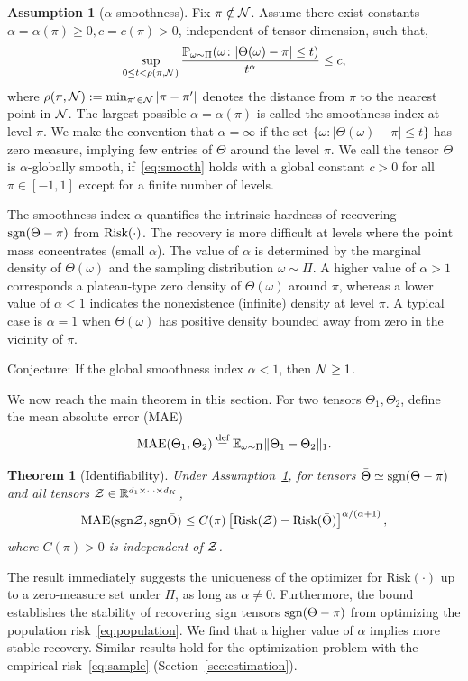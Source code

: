 \documentclass{article}
\theoremstyle{plain}
\newtheorem{thm}{Theorem}[section]
\theoremstyle{definition}
\newtheorem{assumption}{Assumption}
\def\sign{\textup{sgn}}
\def\risk{\textup{Risk}}
\begin{document}

\begin{assumption}[$\alpha$-smoothness]\label{ass:margin} 
Fix $\pi\notin \mathcal{N}$. Assume there exist constants $\alpha=\alpha(\pi)\geq 0, c=c(\pi) >0$, independent of tensor dimension, such that, 
\begin{equation}\label{eq:smooth}
\sup_{0\leq t<\rho(\pi, \mathcal{N})}{\mathbb{P}_{\omega \sim \Pi}(\omega \colon |\Theta (\omega)-\pi|\leq t )\over t^\alpha} \leq c,
\end{equation}
where $\rho(\pi,\mathcal{N}):=\min_{\pi'\in \mathcal{N}}|\pi-\pi'|$ denotes the distance from $\pi$ to the nearest point in $\mathcal{N}$. The largest possible $\alpha=\alpha(\pi)$ is called the smoothness index at level $\pi$. We make the convention that $\alpha= \infty$ if the set $\{\omega\colon |\Theta(\omega)-\pi|\leq t\}$ has zero measure, implying few entries of $\Theta$ around the level $\pi$. We call the tensor $\Theta$ is $\alpha$-globally smooth, if~\eqref{eq:smooth} holds with a global constant $c>0$ for all $\pi\in[-1,1]$ except for a finite number of levels. 
\end{assumption}

The smoothness index $\alpha$ quantifies the intrinsic hardness of recovering $\sign(\Theta-\pi)$ from $\risk(\cdot)$. The recovery is more difficult at levels where the point mass concentrates (small $\alpha$). The value of $\alpha$ is determined by the marginal density of $\Theta(\omega)$ and the sampling distribution $\omega\sim \Pi$. A higher value of $\alpha>1$ corresponds a plateau-type zero density of $\Theta(\omega)$ around $\pi$, whereas a lower value of $\alpha<1$ indicates the nonexistence (infinite) density at level $\pi$. A typical case is $\alpha=1$ when $\Theta(\omega)$ has positive density bounded away from zero in the vicinity of $\pi$. 

{\color{red}Conjecture: If the global smoothness index $\alpha<1$, then $\mathcal{N}\geq 1$. }


We now reach the main theorem in this section. For two tensors $\Theta_1,\Theta_2$, define the mean absolute error (MAE)
\[
\text{MAE}(\Theta_1, \Theta_2)\stackrel{\text{def}}{=}\mathbb{E}_{\omega\sim \Pi}\lVert\Theta_1-\Theta_2\rVert_1.
\]
\begin{thm}[Identifiability] Under Assumption~\ref{ass:margin}, for tensors $\bar \Theta \simeq \sign(\Theta-\pi)$ and all tensors $\mathcal{Z}\in\mathbb{R}^{d_1\times \cdots \times d_K}$,
\[
\textup{MAE}(\sign \tZ, \sign \bar \Theta) \leq C(\pi)\left[\textup{Risk}(\tZ)-\textup{Risk}( \bar \Theta)\right]^{\alpha/(\alpha+1)},
\]
where $C(\pi)>0$ is independent of $\mathcal{Z}$. 
\end{thm}
The result immediately suggests the uniqueness of the optimizer for $\text{Risk}(\cdot)$ up to a zero-measure set under $\Pi$, as long as $\alpha\neq 0$. Furthermore, the bound establishes the stability of recovering sign tensors $\sign (\Theta-\pi)$ from optimizing the population risk~\eqref{eq:population}. We find that a higher value of $\alpha$ implies more stable recovery. Similar results hold for the optimization problem with the empirical risk~\eqref{eq:sample} (Section~\ref{sec:estimation}). 
\end{document}
